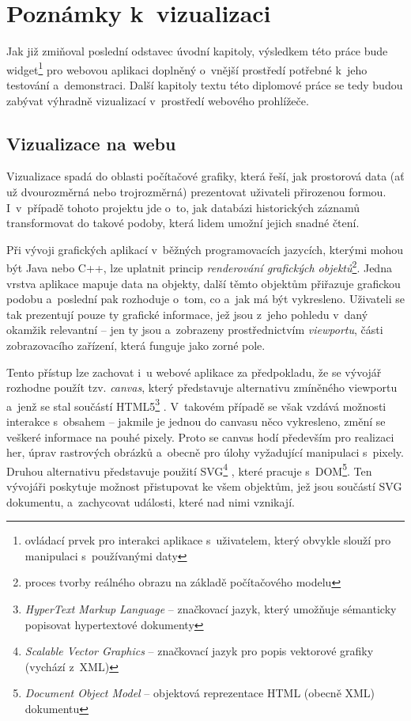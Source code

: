 \chapter{Poznámky k~vizualizaci}
	Jak již zmiňoval poslední odstavec úvodní kapitoly, výsledkem této práce bude wid\-get\footnote{ovládací prvek pro interakci aplikace s~uživatelem, který obvykle slouží pro manipulaci s~používanými daty} pro webovou aplikaci doplněný o~vnější prostředí potřebné k~jeho testování a~demonstraci. Další kapitoly textu této diplomové práce se tedy budou zabývat výhradně vizualizací v~prostředí webového prohlížeče.
	
	\section{Vizualizace na webu}
		Vizualizace spadá do oblasti počítačové grafiky, která řeší, jak prostorová data (ať už dvourozměrná nebo trojrozměrná) prezentovat uživateli přirozenou formou. I~v~případě tohoto projektu jde o~to, jak databázi historických záznamů transformovat do takové podoby, která lidem umožní jejich snadné čtení.
		
		Při vývoji grafických aplikací v~běžných programovacích jazycích, kterými mohou být Java nebo C++, lze uplatnit princip \emph{renderování grafických objektů}\footnote{proces tvorby reálného obrazu na základě počítačového modelu}. Jedna vrstva aplikace mapuje data na objekty, další těmto objektům přiřazuje grafickou podobu a~poslední pak rozhoduje o~tom, co a~jak má být vykresleno. Uživateli se tak prezentují pouze ty grafické informace, jež jsou z~jeho pohledu v~daný okamžik relevantní -- jen ty jsou  a~zobrazeny prostřednictvím \emph{viewportu}, části zobrazovacího zařízení, která funguje jako zorné pole.
		
		Tento přístup lze zachovat i~u webové aplikace za předpokladu, že se vývojář rozhodne použít tzv. \emph{canvas}, který představuje alternativu zmíněného viewportu a~jenž se stal součástí HTML5\footnote{\emph{HyperText Markup Language} -- značkovací jazyk, který umožňuje sémanticky popisovat hypertextové dokumenty} \cite{w3c-2014}. V~takovém případě se však vzdává možnosti interakce s~obsahem -- jakmile je jednou do canvasu něco vykresleno, změní se veškeré informace na pouhé pixely. Proto se canvas hodí především pro realizaci her, úprav rastrových obrázků a~obecně pro úlohy vyžadující manipulaci s~pixely. Druhou alternativu představuje použití SVG\footnote{\emph{Scalable Vector Graphics} -- značkovací jazyk pro popis vektorové grafiky (vychází z~XML)} \cite{opera-2010}, které pracuje s~DOM\footnote{\emph{Document Object Model} -- objektová reprezentace HTML (obecně XML) dokumentu}. Ten vývojáři poskytuje možnost přistupovat ke všem objektům, jež jsou součástí SVG dokumentu, a~zachycovat události, které nad nimi vznikají.
		
